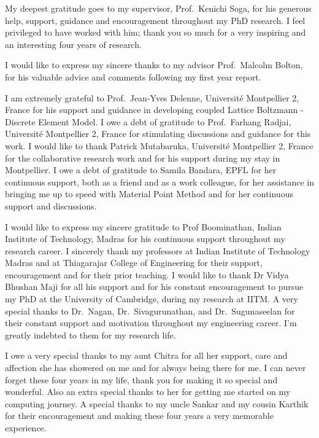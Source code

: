 
\begin{acknowledgements}      

My deepest gratitude goes to my supervisor, Prof.~Kenichi Soga, for his 
generous help, support, guidance and encouragement throughout my PhD research. 
I feel privileged to have worked with him; thank you so much for a very 
inspiring and an interesting four years of research.

I would like to express my sincere thanks to my advisor Prof.~Malcolm Bolton, 
for his valuable advice and comments following my first year report.

I am extremely grateful to Prof.~Jean-Yves Delenne, Universit\'{e} Montpellier 
2, France for his support and guidance in developing coupled Lattice Boltzmann 
- Discrete Element Model. I owe a debt of gratitude to Prof.~Farhang Radjai, 
Universit\'{e} Montpellier 2, France for stimulating discussions and guidance 
for this work. I would like to thank Patrick Mutabaruka, Universit\'{e} 
Montpellier 2, France for the collaborative research work and for his support 
during my stay in Montpellier. I owe a debt of gratitude to Samila Bandara, 
EPFL for her continuous support, both as a friend and as a work colleague, for 
her assistance in bringing me up to speed with Material Point Method and for 
her continuous support and discussions.

I would like to express my sincere gratitude to Prof Boominathan, Indian 
Institute of Technology, Madras for his continuous support throughout my 
research career. I sincerely thank my professors at Indian Institute of 
Technology Madras and at Thiagarajar College of Engineering for their support, 
encouragement and for their prior teaching. I would like to thank Dr Vidya 
Bhushan Maji for all his support and for his constant encouragement to pursue 
my PhD at the University of Cambridge, during my research at IITM. A very 
special thanks to Dr.~Nagan, Dr.~Sivagurunathan, and Dr.~Sugunaseelan for their 
constant support and motivation throughout my engineering career. I'm greatly 
indebted to them for my research life.

I owe a very special thanks to my aunt Chitra for all her support, care and 
affection she has showered on me and for always being there for me. I can never 
forget these four years in my life, thank you for making it so special and 
wonderful. Also an extra special thanks to her for getting me started on my 
computing journey. A special thanks to my uncle Sankar and my cousin Karthik 
for their encouragement and making these four years a very memorable experience.


\end{acknowledgements}
